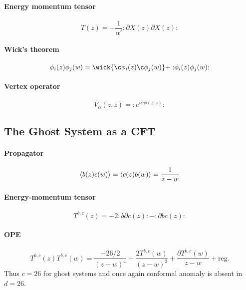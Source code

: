 \documentclass[12pt, a4paper, DIV=15]{article}
\numberwithin{equation}{section}
\newcommand{\normord}[1]{:\mathrel{#1}:}
\begin{document}
\paragraph{Energy momentum tensor}
\begin{equation}
	T(z) = - \frac{1}{\alpha'} \normord{\partial X(z) \partial X(z)}
\end{equation}

\paragraph{Wick's theorem}
\begin{equation}
	\phi_i(z) \phi_j (w) = \wick{\c \phi_i(z) \c \phi_j (w)} + \normord{\phi_i(z) \phi_j (w)}
\end{equation}

\paragraph{Vertex operator}
\begin{equation}
	V_\alpha(z,\bar{z}) = \normord{e^{i\alpha\phi(z,\bar{z})}}
\end{equation}
\subsection{The Ghost System as a CFT}
\paragraph{Propagator}
\begin{equation}
	\expval{b(z) c(w)} = \expval{c(z) b(w) } = \frac{1}{z-w}
\end{equation}

\paragraph{Energy-momentum tensor}
\begin{equation}
	T^{b,c}(z) = -2 \normord{b \partial c (z)} - \normord{\partial b c (z)}
\end{equation}

\paragraph{OPE}
\begin{equation}
	T^{b,c}(z) T^{b,c}(w) = \frac{-26/2}{(z-w)^4} + \frac{2T^{b,c}(w)}{(z-w)^2} + \frac{\partial T^{b,c}(w)}{z-w} + \text{reg.}
\end{equation}
Thus $c=26$ for ghost systems and once again conformal anomaly is absent in $d=26$.
\end{document}
